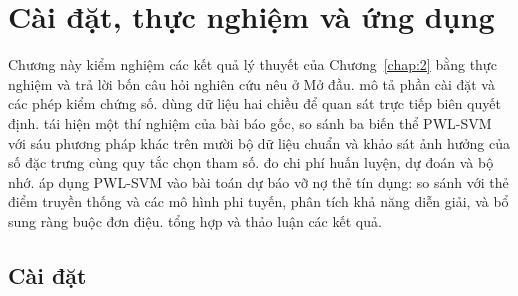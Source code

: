 \chapter{Cài đặt, thực nghiệm và ứng dụng}\label{chap:3}

Chương này kiểm nghiệm các kết quả lý thuyết của Chương~\ref{chap:2} bằng thực nghiệm và trả lời bốn câu hỏi nghiên cứu nêu ở Mở đầu.  mô tả phần cài đặt và các phép kiểm chứng số.  dùng dữ liệu hai chiều để quan sát trực tiếp biên quyết định.  tái hiện một thí nghiệm của bài báo gốc, so sánh ba biến thể PWL-SVM với sáu phương pháp khác trên mười bộ dữ liệu chuẩn và khảo sát ảnh hưởng của số đặc trưng cùng quy tắc chọn tham số.  đo chi phí huấn luyện, dự đoán và bộ nhớ.  áp dụng PWL-SVM vào bài toán dự báo vỡ nợ thẻ tín dụng: so sánh với thẻ điểm truyền thống và các mô hình phi tuyến, phân tích khả năng diễn giải, và bổ sung ràng buộc đơn điệu.  tổng hợp và thảo luận các kết quả.

\section{Cài đặt}\label{sec:impl}

